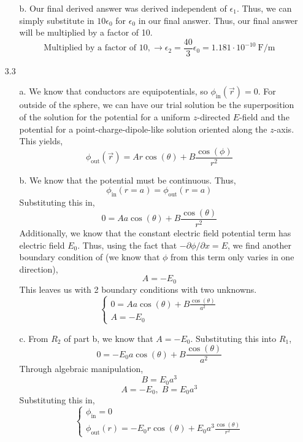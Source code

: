 \documentclass[12pt]{article}
\begin{document}
\begin{enumerate}
\begin{enumerate}
		\item [b.]
		Our final derived answer was derived independent of $\epsilon_1$.
		Thus, we can simply substitute in $10\epsilon_0$ for $\epsilon_0$ in our final answer.
		Thus, our final answer will be multiplied by a factor of 10.
		\[\boxed{\text{Multiplied by a factor of 10}, \to \epsilon_2 = \frac{40}{3}\epsilon_0=1.181\cdot10^{-10}\:\mathrm{F/m}}\]
	\end{enumerate}

	\item [3.3]
	\begin{enumerate}
		\item [a.]
		We know that conductors are equipotentials, so $\phi_{\mathrm{in}}(\vec r)=0$.
		For outside of the sphere, we can have our trial solution be the superposition of the solution for the potential for a uniform $z$-directed $E$-field and the potential for a point-charge-dipole-like solution oriented along the $z$-axis.
		This yields,
		\[\phi_{\mathrm{out}}(\vec r)=Ar\cos(\theta)+B\frac{\cos(\phi)}{r^2}\]

		\item [b.]
		We know that the potential must be  continuous.
		Thus,
		\[\phi_{\mathrm{in}}(r=a)=\phi_{\mathrm{out}}(r=a)\]
		Substituting this in,
		\[0=Aa\cos(\theta)+B\frac{\cos(\theta)}{r^2}\]
		Additionally, we know that the constant electric field potential term has electric field $E_0$.
		Thus, using the fact that $-\partial \phi/\partial x=E$, we find another boundary condition of (we know that $\phi$ from this term only varies in one direction),
		\[A=-E_0\]
		This leaves us with 2 boundary conditions with two unknowns.
		\[\boxed{\begin{cases}
			0 = Aa\cos(\theta)+B\frac{\cos(\theta)}{a^2} \\ 
			A=-E_0
		\end{cases}}\]
		
		\item [c.]
		From $R_2$ of part b, we know that $A=-E_0$.
		Substituting this into $R_1$,
		\[0=-E_0a\cos(\theta)+B\frac{\cos(\theta)}{a^2}\]
		Through algebraic manipulation,
		\[B = E_0a^3\]
		\[\boxed{A=-E_0, \; B=E_0a^3}\]
		Substituting this in,
		\[\boxed{\begin{cases}
			\phi_{\mathrm{in}} = 0 \\ 
			\phi_{\mathrm{out}}(r)=-E_0r\cos(\theta)+E_0a^3\frac{\cos(\theta)}{r^2}	
		\end{cases}}\]


\end{enumerate}
\end{enumerate}
\end{document}
